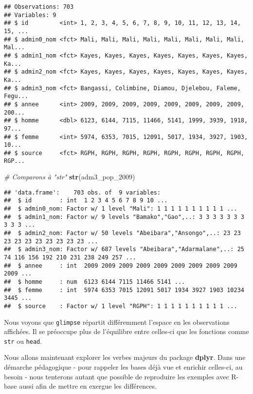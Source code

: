 \documentclass[]{book}
\newenvironment{Shaded}{\begin{snugshade}}{\end{snugshade}}
\newcommand{\KeywordTok}[1]{\textcolor[rgb]{0.13,0.29,0.53}{\textbf{#1}}}
\newcommand{\DecValTok}[1]{\textcolor[rgb]{0.00,0.00,0.81}{#1}}
\newcommand{\CommentTok}[1]{\textcolor[rgb]{0.56,0.35,0.01}{\textit{#1}}}
\newcommand{\NormalTok}[1]{#1}
\begin{document}
\begin{verbatim}
## Observations: 703
## Variables: 9
## $ id         <int> 1, 2, 3, 4, 5, 6, 7, 8, 9, 10, 11, 12, 13, 14, 15, ...
## $ admin0_nom <fct> Mali, Mali, Mali, Mali, Mali, Mali, Mali, Mali, Mal...
## $ admin1_nom <fct> Kayes, Kayes, Kayes, Kayes, Kayes, Kayes, Kayes, Ka...
## $ admin2_nom <fct> Kayes, Kayes, Kayes, Kayes, Kayes, Kayes, Kayes, Ka...
## $ admin3_nom <fct> Bangassi, Colimbine, Diamou, Djelebou, Faleme, Fegu...
## $ annee      <int> 2009, 2009, 2009, 2009, 2009, 2009, 2009, 2009, 200...
## $ homme      <dbl> 6123, 6144, 7115, 11466, 5141, 1999, 3939, 1918, 97...
## $ femme      <int> 5974, 6353, 7015, 12091, 5017, 1934, 3927, 1903, 10...
## $ source     <fct> RGPH, RGPH, RGPH, RGPH, RGPH, RGPH, RGPH, RGPH, RGP...
\end{verbatim}

\begin{Shaded}
\begin{Highlighting}[]
\CommentTok{# Comparons à "str"}
\KeywordTok{str}\NormalTok{(adm3_pop_}\DecValTok{2009}\NormalTok{)}
\end{Highlighting}
\end{Shaded}

\begin{verbatim}
## 'data.frame':    703 obs. of  9 variables:
##  $ id        : int  1 2 3 4 5 6 7 8 9 10 ...
##  $ admin0_nom: Factor w/ 1 level "Mali": 1 1 1 1 1 1 1 1 1 1 ...
##  $ admin1_nom: Factor w/ 9 levels "Bamako","Gao",..: 3 3 3 3 3 3 3 3 3 3 ...
##  $ admin2_nom: Factor w/ 50 levels "Abeibara","Ansongo",..: 23 23 23 23 23 23 23 23 23 23 ...
##  $ admin3_nom: Factor w/ 687 levels "Abeibara","Adarmalane",..: 25 74 116 156 192 210 231 238 249 257 ...
##  $ annee     : int  2009 2009 2009 2009 2009 2009 2009 2009 2009 2009 ...
##  $ homme     : num  6123 6144 7115 11466 5141 ...
##  $ femme     : int  5974 6353 7015 12091 5017 1934 3927 1903 10234 3445 ...
##  $ source    : Factor w/ 1 level "RGPH": 1 1 1 1 1 1 1 1 1 1 ...
\end{verbatim}

Nous voyons que \texttt{glimpse} répartit différemment l'espace en les
observations affichées. Il se préoccupe plus de l'équilibre entre
celles-ci que les fonctions comme \texttt{str} ou \texttt{head}.

Nous allons maintenant explorer les verbes majeurs du package
\textbf{dplyr}. Dans une démarche pédagogique - pour rappeler les bases
déjà vue et enrichir celles-ci, au besoin - nous tenterons autant que
possible de reproduire les exemples avec R-base aussi afin de mettre en
exergue les différences.
\end{document}
